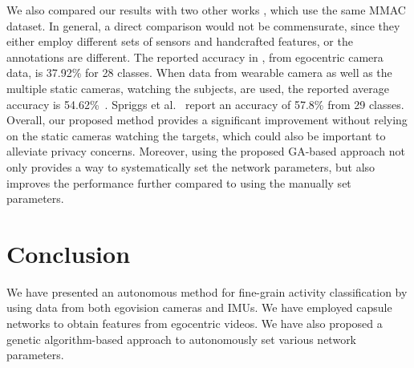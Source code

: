 \documentclass[10pt,twocolumn,letterpaper]{article}
\begin{document}
\begin{table}[hb!] \vspace{-0.25cm}
\caption{Accuracy rates from different modalities and approaches for 9-label classification}
\label{table:comp9class}
\vspace{-0.35cm}
\end{table}


We also compared our results with two other works \cite{Spriggs2009Temporal}\cite{Soran15}, which use the same MMAC dataset. In general, a direct comparison would not be commensurate, since they either employ different sets of sensors and handcrafted features, or the annotations are different. The reported accuracy in \cite{Soran15}, from egocentric camera data, is 37.92\% for 28 classes. When data from wearable camera as well as the multiple static cameras, watching the subjects, are used, the reported average accuracy is 54.62\%~\cite{Soran15}. Spriggs et al.~\cite{Spriggs2009Temporal} report an accuracy of 57.8\% from 29 classes. Overall, our proposed method provides a significant improvement without relying on the static cameras watching the targets, which could also be important to alleviate privacy concerns. Moreover, using the proposed GA-based approach not only provides a way to systematically set the network parameters, but also improves the performance further compared to using the manually set parameters.

\vspace{-0.25cm}
\section{Conclusion} \vspace{-0.2cm}
We have presented an autonomous method for fine-grain activity classification by using data from both egovision cameras and IMUs. We have employed capsule networks to obtain features from egocentric videos.
We have also proposed a genetic algorithm-based approach to autonomously set various network parameters. \vspace{-0.15cm}

{\footnotesize


}
\end{document}

